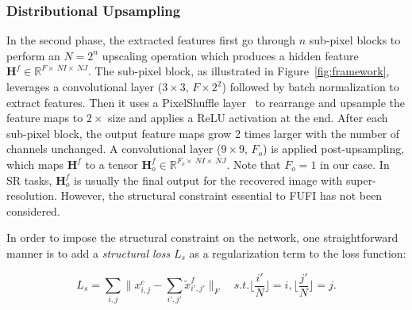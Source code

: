 \subsubsection{Distributional Upsampling}
In the second phase, the extracted features first go through $n$ sub-pixel blocks to perform an $N=2^n$ upscaling operation which produces a hidden feature $\mathbf{H}^f \in \mathbb{R}^{F\times~NI\times~NJ}$. The sub-pixel block, as illustrated in Figure~\ref{fig:framework}, leverages a convolutional layer ($3\times 3$, $F\times2^2$) followed by batch normalization to extract features. Then it uses a PixelShuffle layer~\cite{shi2016espcn} to rearrange and upsample the feature maps to $2\times$ size and applies a ReLU activation at the end. After each sub-pixel block, the output feature maps grow 2 times larger with the number of channels unchanged. A convolutional layer ($9\times 9$, $F_o$) is applied post-upsampling, which maps $\mathbf{H}^f$ to a tensor $\mathbf{H}^f_o \in \mathbb{R}^{F_o\times~NI\times~NJ}$. Note that $F_o=1$ in our case. In SR tasks, $\mathbf{H}^f_o$ is usually the final output for the recovered image with super-resolution. However, the structural constraint essential to FUFI has not been considered.


In order to impose the structural constraint on the network, one straightforward manner is to add a \emph{structural loss} $L_s$ as a regularization term to the loss function:
\iffalse
\begin{equation}
	L_s = \sum_{i,j}{\bigg\lVert x^c_{i,j} - \sum_{\left\lfloor{\frac{i'}{N}}\right\rfloor=i,\left\lfloor{\frac{j'}{N}}\right\rfloor=j}{\tilde{x}^f_{i',j'}}\bigg\rVert_F}
\end{equation}
\fi
\begin{equation}
	L_s = \sum_{i,j}{\bigg\lVert x^c_{i,j} - \sum_{i',j'}{\tilde{x}^f_{i',j'}}\bigg\rVert_F} \quad s.t. \lfloor{\frac{i'}{N}}\rfloor=i,\lfloor{\frac{j'}{N}}\rfloor=j.
\end{equation}


